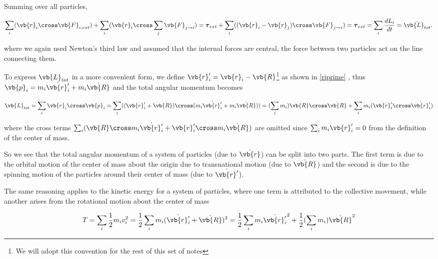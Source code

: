 \documentclass[a4paper,12pt]{report}
\begin{document}
Summing over all particles, 

\begin{equation}
	\sum_{i}^{} (\vb{r} _{i} \cross \vb{F} _{i,ext}) + \sum_{i}^{} (\vb{r} _{i} \cross \sum_{j}^{} \vb{F} _{j \rightarrow i}) = \boldsymbol{\tau }_{ext}  + \sum_{i}^{} ((\vb{r} _{i} - \vb{r} _{j} ) \cross  \vb{F} _{j \rightarrow  i } ) = \boldsymbol{\tau } _{ext} = \sum_{i}^{} \frac{dL_{i} }{dt}  = \dot{\vb{L}_{tot}}. 
\end{equation}

where we again used Newton's third law and assumed that the internal forces are central, \ie the force between two particles act on the line connecting them.

To express \(\vb{L} _{tot} \) in a more convenient form, we define \(\vb{r}'_{i} = \vb{r} _{i} - \vb{R}  \)\footnote{We will adopt this convention for the rest of this set of notes}  as shown in \cref{riprime}  , thus \(\vb{p} _{i} = m_{i}\dot{\vb{r} '_{i} }  + m_{i} \dot{\vb{R} }  \) and the total angular momentum becomes 

\begin{equation}
	\vb{L} _{tot} = \sum_{i}^{} \vb{r} _{i} \cross \vb{p} _{i} = \sum_{i}^{}  ((\vb{r} '_{i} + \vb{R} ) \cross (m_{i}\dot{\vb{r} '_{i} }  + m_{i} \dot{\vb{R} } )) = (\sum_{i}^{} m_{i}) \vb{R} \cross \dot{\vb{R} } + \sum_{i}^{} m_{i} (\vb{r} '_{i} \cross \dot{\vb{r} '_{i} } )  \label{L1}   
\end{equation}

where the cross terms \(\sum_{i}^{} (\vb{R} \cross m_{i} \dot{\vb{r} '_{i} }  + \vb{r} '_{i} \cross m_{i}  \dot{\vb{R} } ) \) are omitted since \(\sum_{i}^{} m_{i} \vb{r} '_{i} = 0 \) from the definition of the center of mass.

So we see that the total angular momentum of a system of particles (due to \(\dot{\vb{r} } \))  can be split into two parts. The first term is due to the orbital motion of the center of mass about the origin due to transnational motion (due to \(\dot{\vb{R} } \))  and the second is due to the spinning motion of the particles around their center of mass (due to \(\dot{\vb{r} '} \)).

The same reasoning applies to the kinetic energy for a system of particles, where one term is attributed to the collective movement, while another arises from the rotational motion about the center of mass

\begin{equation}
	T = \sum_{i}^{} \frac{1}{2} m_{i} v_{i} ^2 = \frac{1}{2}  \sum_{i}^{}  m_{i} (\dot{\vb{r} '_{i} } + \dot{\vb{R} } )^2 = \frac{1}{2} \sum_{i}^{} m_{i} \dot{\vb{r} '_{i} } ^2 + \frac{1}{2} (\sum_{i}^{} m_{i} ) \dot{\vb{R} } ^2  \label{T1}   
\end{equation}
\end{document}

